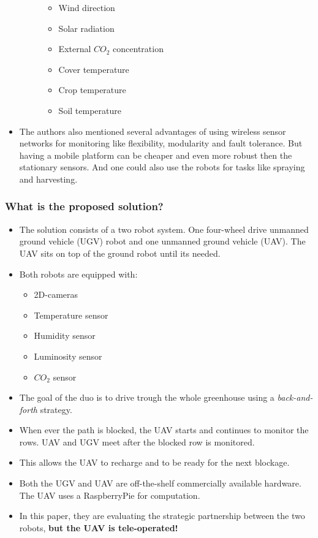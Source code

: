 \documentclass{article}
\begin{document}
\begin{itemize}
\begin{description}
\begin{itemize}
            \item Wind direction
            \item Solar radiation
            \item External $CO_2$ concentration
            \item Cover temperature
            \item Crop temperature
            \item Soil temperature 
        \end{itemize}
    \end{description}
    \item The authors also mentioned several advantages of using wireless sensor networks for monitoring like flexibility, 
    modularity and fault tolerance. But having a mobile platform can be cheaper and even more robust then the stationary sensors. 
    And one could also use the robots for tasks like spraying and harvesting.
\end{itemize}
    \subsubsection*{What is the proposed solution?}
\begin{itemize}
    \item The solution consists of a two robot system. One four-wheel drive unmanned ground vehicle (UGV) robot and one unmanned ground vehicle (UAV). The UAV sits on top of the ground robot until its needed.
    \item Both robots are equipped with: \begin{itemize}
        \item 2D-cameras
        \item Temperature sensor
        \item Humidity sensor
        \item Luminosity sensor
        \item $CO_2$ sensor
    \end{itemize}
    \item The goal of the duo is to drive trough the whole greenhouse using a \emph{back-and-forth} strategy.
    \item When ever the path is blocked, the UAV starts and continues to monitor the rows. UAV and UGV meet after the blocked row is monitored. 
    \item This allows the UAV to recharge and to be ready for the next blockage.
    \item Both the UGV and UAV are off-the-shelf commercially available hardware. The UAV uses a RaspberryPie for computation.
    \item In this paper, they are evaluating the strategic partnership between the two robots, \textbf{but the UAV is tele-operated!}
\end{itemize}
\end{document}
